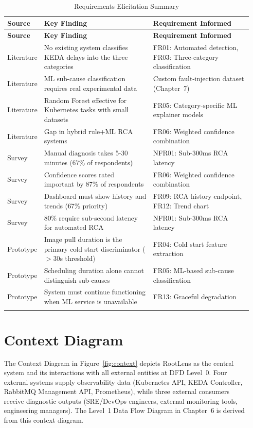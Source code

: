 \begin{xltabular}{\textwidth}{|p{2cm}|X|X|}

\hline
\textbf{Source} & \textbf{Key Finding} & \textbf{Requirement Informed} \\ \hline
\endfirsthead

\hline
\textbf{Source} & \textbf{Key Finding} & \textbf{Requirement Informed} \\ \hline
\endhead

Literature & No existing system classifies KEDA delays into the three categories & FR01: Automated detection, FR03: Three-category classification \\ \hline
Literature & ML sub-cause classification requires real experimental data & Custom fault-injection dataset (Chapter~7) \\ \hline
Literature & Random Forest effective for Kubernetes tasks with small datasets & FR05: Category-specific ML explainer models \\ \hline
Literature & Gap in hybrid rule+ML RCA systems & FR06: Weighted confidence combination \\ \hline
Survey & Manual diagnosis takes 5-30 minutes (67\% of respondents) & NFR01: Sub-300ms RCA latency \\ \hline
Survey & Confidence scores rated important by 87\% of respondents & FR06: Weighted confidence combination \\ \hline
Survey & Dashboard must show history and trends (67\% priority) & FR09: RCA history endpoint, FR12: Trend chart \\ \hline
Survey & 80\% require sub-second latency for automated RCA & NFR01: Sub-300ms RCA latency \\ \hline
Prototype & Image pull duration is the primary cold start discriminator ($>$30s threshold) & FR04: Cold start feature extraction \\ \hline
Prototype & Scheduling duration alone cannot distinguish sub-causes & FR05: ML-based sub-cause classification \\ \hline
Prototype & System must continue functioning when ML service is unavailable & FR13: Graceful degradation \\ \hline

\caption{Requirements Elicitation Summary}
\label{tab:elicitation_summary}
\end{xltabular}

\section{Context Diagram}
The Context Diagram in Figure~\ref{fig:context} depicts RootLens as the central system and its interactions with all external entities at DFD Level~0. Four external systems supply observability data (Kubernetes API, KEDA Controller, RabbitMQ Management API, Prometheus), while three external consumers receive diagnostic outputs (SRE/DevOps engineers, external monitoring tools, engineering managers). The Level~1 Data Flow Diagram in Chapter~6 is derived from this context diagram.

